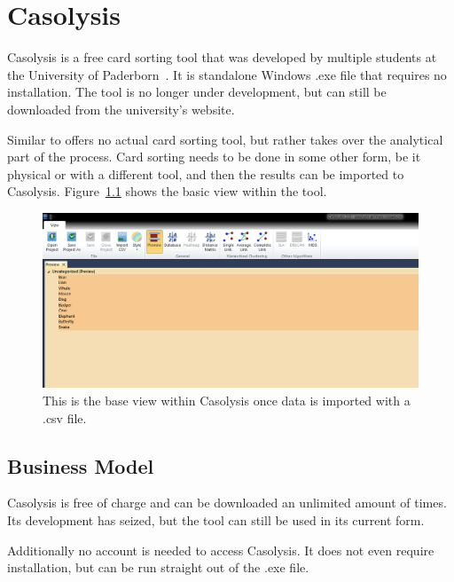 \chapter{Casolysis}

\label{chap:Casolysis}

Casolysis is a free card sorting tool that was developed by multiple
students at the University of Paderborn~\parencite{Casolysis}. It is
standalone Windows .exe file that requires no installation. The tool 
is no longer under development, but can still be downloaded from the 
university's website.

Similar to \textcite{SynCaps}  offers no actual card sorting tool, but rather
takes over the analytical part of the process. Card sorting needs to
be done in some other form, be it physical or with a different tool,
and then the results can be imported to Casolysis. Figure~\ref{fig:Casolysis1}
shows the basic view within the tool.

\begin{figure}[tp] 
\centering
\includegraphics[keepaspectratio,width=\linewidth,height=\halfh]{images/casolysis-sorting.png}
\caption[Casolysis Application] { This is the base view within Casolysis
once data is imported with a .csv file.
 }
\label{fig:Casolysis1}
\end{figure}

\section{Business Model}
Casolysis is free of charge and can be downloaded an unlimited amount
of times. Its development has seized, but the tool can still be used
in its current form.

Additionally no account is needed to access Casolysis. It does
not even require installation, but can be run straight out of the .exe
file.

